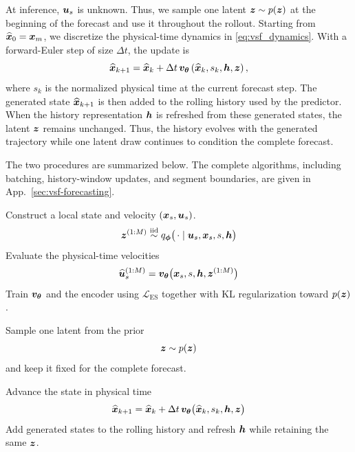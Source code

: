 At inference, ${\bm{u}}_s$ is unknown. Thus, we sample one latent ${\bm{z}}\sim p({\bm{z}})$ at the beginning of the forecast and use it throughout the rollout. Starting from
$\widehat{{\bm{x}}}_0={\bm{x}}_m$, we discretize the physical-time dynamics in
\cref{eq:vsf_dynamics}. With a forward-Euler step of size $\Delta t$,
the update is
\begin{equation}
\widehat{{\bm{x}}}_{k+1}
=
\widehat{{\bm{x}}}_{k}
+
\Delta t\,
{\bm{v}}_{{\bm{\theta}}}
\left(
\widehat{{\bm{x}}}_{k},
s_k,
{\bm{h}},
{\bm{z}}
\right),
\label{eq:vsf_inference_update}
\end{equation}
where $s_k$ is the normalized physical time at the current forecast step.
The generated state $\widehat{{\bm{x}}}_{k+1}$ is then added to the rolling
history used by the predictor. When the history representation ${\bm{h}}$ is
refreshed from these generated states, the latent ${\bm{z}}$ remains unchanged.
Thus, the history evolves with the generated trajectory while one latent draw
continues to condition the complete forecast.

The two procedures are summarized below. The complete algorithms, including
batching, history-window updates, and segment boundaries, are given in
App.~\ref{sec:vsf-forecasting}.

\noindent
\begin{minipage}[t]{0.485\linewidth}
\vspace{0pt}
\begin{tcolorbox}[
colback=sage,
colframe=sageborder,
boxrule=0.3pt,
left=6pt,
right=6pt,
top=5pt,
bottom=5pt,
title=\textbf{Training},
equal height group=vsf-summary
]
\small

Construct a local state and velocity
$({\bm{x}}_s,{\bm{u}}_s)$.
%
\[
{\bm{z}}^{(1:M)}
\stackrel{\mathrm{iid}}{\sim}
q_{\boldsymbol{\phi}}
\bigl(
\,\cdot\mid
{\bm{u}}_s,{\bm{x}}_s,s,{\bm{h}}
\bigr)
\]
%
Evaluate the physical-time velocities
%
\[
\widehat{{\bm{u}}}_s^{(1:M)}
=
{\bm{v}}_{{\bm{\theta}}}
\bigl(
{\bm{x}}_s,s,{\bm{h}},{\bm{z}}^{(1:M)}
\bigr)
\]
%
Train ${\bm{v}}_{{\bm{\theta}}}$ and the encoder using
$\mathcal L_{\mathrm{ES}}$ together with KL regularization toward $p({\bm{z}})$.

\end{tcolorbox}
\end{minipage}
\hfill
\begin{minipage}[t]{0.485\linewidth}
\vspace{0pt}
\begin{tcolorbox}[
colback=lavender,
colframe=lavenderborder,
boxrule=0.3pt,
left=6pt,
right=6pt,
top=5pt,
bottom=5pt,
title=\textbf{Inference},
equal height group=vsf-summary
]
\small

Sample one latent from the prior
%
\[
{\bm{z}}\sim p({\bm{z}})
\]
%
and keep it fixed for the complete forecast.

Advance the state in physical time
%
\[
\widehat{{\bm{x}}}_{k+1}
=
\widehat{{\bm{x}}}_{k}
+
\Delta t\,
{\bm{v}}_{{\bm{\theta}}}
\bigl(
\widehat{{\bm{x}}}_{k},s_k,{\bm{h}},{\bm{z}}
\bigr)
\]
%
Add generated states to the rolling history and refresh ${\bm{h}}$ while retaining
the same ${\bm{z}}$.

\end{tcolorbox}
\end{minipage}


